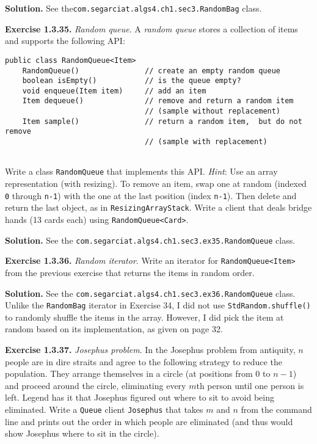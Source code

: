 \documentclass[12pt, a4paper]{article}
\newenvironment{ex}[2][Exercise]
{\par\medskip\noindent \textbf{#1 #2.}}
{\medskip}
\newenvironment{sol}[1][Solution]
{\par\medskip\noindent \textbf{#1.} }
{\medskip}
\begin{document}
	\begin{sol}
		See the\texttt{com.segarciat.algs4.ch1.sec3.RandomBag} class.
	\end{sol}
	\begin{ex}{1.3.35}
		\emph{Random queue}. A \emph{random queue} stores a collection of items and supports the
		following API:
		\begin{lstlisting}[language={}]
public class RandomQueue<Item>
	RandomQueue()				// create an empty random queue
	boolean isEmpty()			// is the queue empty?
	void enqueue(Item item)		// add an item
	Item dequeue()				// remove and return a random item
								// (sample without replacement)
	Item sample()				// return a random item,  but do not remove
								// (sample with replacement)
	
		\end{lstlisting}
	Write a class \texttt{RandomQueue} that implements this API. \emph{Hint}: Use an array representation
	(with resizing). To remove an item, swap one at random (indexed \texttt{0} through \texttt{n-1})
	with the one at the last position (index \texttt{n-1}). Then delete and return the last object,
	as in \texttt{ResizingArrayStack}. Write a client that deals bridge hands (13 cards each)
	using \texttt{RandomQueue<Card>}.
	\end{ex}
	\begin{sol}
		See the \texttt{com.segarciat.algs4.ch1.sec3.ex35.RandomQueue} class.
	\end{sol}
	\begin{ex}{1.3.36}
		\emph{Random iterator}. Write an iterator for \texttt{RandomQueue<Item>} from the previous
		exercise that returns the items in random order.
	\end{ex}
	\begin{sol}
		See the \texttt{com.segarciat.algs4.ch1.sec3.ex36.RandomQueue} class. Unlike
		the \texttt{RandomBag} iterator in Exercise 34, I did not use \texttt{StdRandom.shuffle()}
		to randomly shuffle the items in the array. However, I did pick the item at random based on
		its implementation, as given on page 32.
	\end{sol}
	\begin{ex}{1.3.37}
		\emph{Josephus problem}. In the Josephus problem from antiquity, $n$ people are in dire
		straits and agree to the following strategy to reduce the population. They arrange
		themselves in a circle (at positions from $0$ to $n-1$) and proceed around the circle,
		eliminating every $m$th person until one person is left. Legend has it that Josephus
		figured out where to sit to avoid being eliminated. Write a \texttt{Queue} client
		\texttt{Josephus} that takes $m$ and $n$ from the command line and prints out the
		order in which people are eliminated (and thus would show Josephus where to sit
		in the circle).
	\end{ex}
\end{document}
